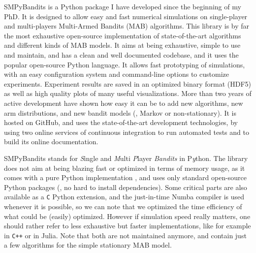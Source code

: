 SMPyBandits is a Python package I have developed since the beginning of my PhD.
It is designed to allow easy and fast numerical simulations on single-player and multi-players Multi-Armed Bandits (MAB) algorithms.
This library is by far the most exhaustive open-source implementation of state-of-the-art algorithms and different kinds of MAB models.
It aims at being exhaustive, simple to use and maintain, and has a clean and well documented codebase, and it uses the popular open-source Python language.
It allows fast prototyping of simulations, with an easy configuration system and command-line options to customize experiments.
Experiment results are saved in an optimized binary format (HDF5) as well as high quality plots of many useful visualizations.
%
More than two years of active development have shown how easy it can be to add new algorithms, new arm distributions, and new bandit models (\eg, Markov or non-stationary).
It is hosted on GitHub, and uses the state-of-the-art development technologies, by using two online services of continuous integration to run automated tests and to build its online documentation.

SMPyBandits stands for \emph{S}ingle and \emph{M}ulti \emph{P}layer \emph{Bandits} in P\emph{y}thon.
The library does not aim at being blazing fast or optimized in terms of memory usage, as it comes with a pure Python implementation \cite{python}, and uses only standard open-source Python packages (\ie, no hard to install dependencies).
Some critical parts are also available as a \texttt{C} Python extension, and the just-in-time Numba compiler \cite{numba} is used whenever it is possible, so we can note that we optimized the time efficiency of what could be (easily) optimized.
However if simulation speed really matters, one should rather refer to less exhaustive but faster implementations, like for example \cite{TorLibbandit} in \texttt{C++} or \cite{VishMABjl} in Julia. Note that both are not maintained anymore, and contain just a few algorithms for the simple stationary MAB model.

